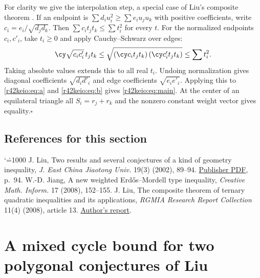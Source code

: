 \documentclass[11pt,a4paper]{article}
\makeatletter
\numberwithin{equation}{section}
\theoremstyle{definition}
\theoremstyle{remark}
\renewenvironment{thebibliography}[1]
 {\subsection*{References for this section}\small
  \list{\@biblabel{\@arabic\c@enumiv}}
       {\settowidth\labelwidth{\@biblabel{#1}}\leftmargin\labelwidth
        \advance\leftmargin\labelsep\@openbib@code
        \usecounter{enumiv}\let\p@enumiv\@empty
        \renewcommand\theenumiv{\@arabic\c@enumiv}}
  \sloppy\clubpenalty4000\widowpenalty4000\sfcode`\.=1000\relax}
 {\def\@noitemerr{\@latex@warning{Empty bibliography}}\endlist}
\makeatother
\begin{document}
For clarity we give the interpolation step, a special case of Liu's composite theorem \cite[Thm.~3]{r42keio:composite}. If an endpoint is $\sum d_i u_i^2\ge\sum e_i u_ju_k$ with positive coefficients, write $c_i=e_i/\sqrt{d_jd_k}$. Then $\sum c_i t_jt_k\le\sum t_i^2$ for every $t$. For the normalized endpoints $c_i,c'_i$, take $t_i\ge0$ and apply Cauchy--Schwarz over edges:
\[
 \cy\sqrt{c_i c'_i}\,t_jt_k
 \le\sqrt{\left(\cy c_i t_jt_k\right)\left(\cy c'_i t_jt_k\right)}
 \le\sum t_i^2.
\]
Taking absolute values extends this to all real $t_i$. Undoing normalization gives diagonal coefficients $\sqrt{d_i d'_i}$ and edge coefficients $\sqrt{e_i e'_i}$. Applying this to \eqref{r42keio:eq:a} and \eqref{r42keio:eq:b} gives \eqref{r42keio:eq:main}. At the center of an equilateral triangle all $S_i=r_j+r_k$ and the nonzero constant weight vector gives equality.\hfill$\square$

\begin{thebibliography}{9}
 J. Liu, Two results and several conjectures of a kind of geometry inequality, \emph{J. East China Jiaotong Univ.} 19(3) (2002), 89--94. \href{https://journal.ecjtu.edu.cn/hdjtdx/article/pdf/20020327}{Publisher PDF}, p.~94.
 W.-D. Jiang, A new weighted Erd\H os--Mordell type inequality, \emph{Creative Math. Inform.} 17 (2008), 152--155.
 J. Liu, The composite theorem of ternary quadratic inequalities and its applications, \emph{RGMIA Research Report Collection} 11(4) (2008), article 13. \href{https://rgmia.org/papers/v11n4/CTTQIApp.pdf}{Author's report}.
\end{thebibliography}

\par\endgroup

\begingroup

\section{\texorpdfstring{A mixed cycle bound for two polygonal conjectures of Liu}{A mixed cycle bound for two polygonal conjectures of Liu}}\label{section:r43showa}
\par\medskip
\end{document}
